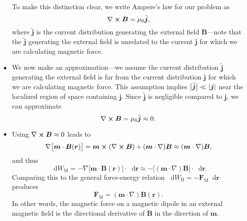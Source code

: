 \documentclass[11pt, a4paper]{article}
\newcommand{\diff}{\mathop{}\!\mathrm{d}} %
\renewcommand{\vec}[1]{\bm{#1}} %
\renewcommand{\t}[1]{\tilde{#1}} %
\renewcommand{\r}{\vec{r}}
\newcommand{\B}{\vec{B}} %
\newcommand{\mm}{\mu_{0}}  %
\newcommand{\m}{\vec{m}}  %
\renewcommand{\j}{\vec{j}}  %
\renewcommand{\curl}{\nabla \cross}
\renewcommand{\grad}{\nabla}
\begin{document}
\begin{itemize}
	To make this distinction clear, we write Ampere's law for our problem as 
	\begin{equation*}
		\curl \B = \mm \t{\j},
	\end{equation*}
	where $ \t{\j} $ is the current distribution generating the external field $ \B $---note that the $ \t{\j} $ generating the external field is unrelated to the current $ \j $ for which we are calculating magnetic force.
	
	\item We now make an approximation---we assume the current distribution $ \t{\j} $ generating the external field is far from the current distribution $ \j $ for which we are calculating magnetic force. This assumption implies $ \big |\t{\j}\big | \ll \abs{\j} $ near the localized region of space containing $ \j $. Since $ \t{\j} $ is negligible compared to $ \j $, we can approximate
	\begin{equation*}
		\curl \B = \mm \t{\j} \approx 0.
	\end{equation*}

	\item Using $ \curl \B \approx 0 $ leads to
	\begin{equation*}
		\grad\big[\m \cdot \B(\r)\big] = \m \cross (\curl \B) + (\m \cdot \grad)\B \approx (\m \cdot \grad)\B,
	\end{equation*}
	and thus
	\begin{equation*}
		\diff W_{\text{M}} = - \grad\big[\m \cdot \B(\r)\big]\cdot  \diff \r \approx - \big[ (\m \cdot \grad)\B\big]\cdot \diff \r.
	\end{equation*}
	Comparing this to the general force-energy relation $ \diff W_{\text{B}} = - \vec{F}_{\text{M}}\diff \r $ produces
	\begin{equation*}
		\vec{F}_{\text{M}} = (\m \cdot \grad)\B(\r).
	\end{equation*}
	In other words, the magnetic force on a magnetic dipole in an external magnetic field is the directional derivative of $ \B $ in the direction of $ \m $.
\end{itemize}
\end{document}
